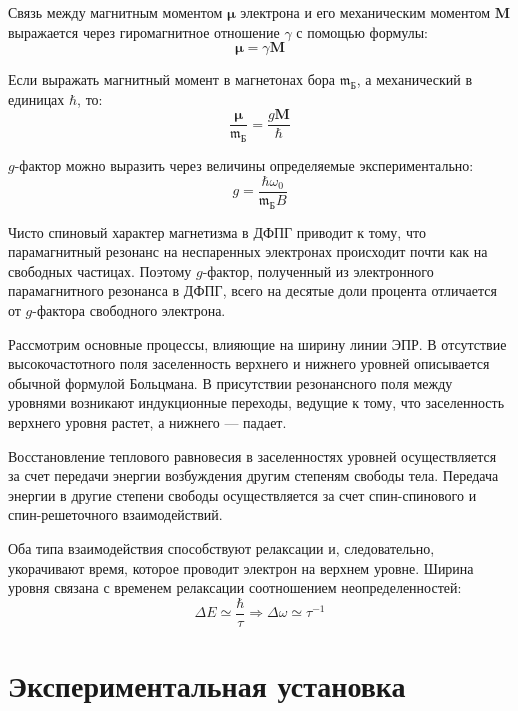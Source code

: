 \documentclass[reprint, nofootinbib, nobalancelastpage, 10pt]{revtex4-2}
\begin{document}
Связь между магнитным моментом $\bm{\mu}$ электрона и его механическим моментом
$\mathbf{M}$ выражается через гиромагнитное отношение $\gamma$ с помощью формулы:
\begin{equation}
	\bm{\mu} = \gamma \mathbf{M}
\end{equation}

Если выражать магнитный момент в магнетонах бора $\mathfrak{m}_{\text{Б}}$, а механический
в единицах $\hbar$, то:
\begin{equation}
	\dfrac{\bm{\mu}}{\mathfrak{m}_{\text{Б}} } = \dfrac{g \mathbf{M}}{\hbar}
\end{equation}

$g$-фактор можно выразить через величины определяемые экспериментально:
\begin{equation}
	g = \dfrac{\hbar \omega_0}{\mathfrak{m}_{\text{Б}} B}
\end{equation}

Чисто спиновый характер магнетизма в ДФПГ приводит к тому, что парамагнитный резонанс
на неспаренных электронах происходит почти как на свободных частицах. Поэтому $g$-фактор,
полученный из электронного парамагнитного резонанса в ДФПГ, всего на десятые доли процента
отличается от $g$-фактора свободного электрона.

Рассмотрим основные процессы, влияющие на ширину линии ЭПР. В отсутствие высокочастотного
поля заселенность верхнего и нижнего уровней описывается обычной формулой Больцмана.
В присутствии резонансного поля между уровнями возникают индукционные переходы, ведущие к
тому, что заселенность верхнего уровня растет, а нижнего --- падает.

Восстановление теплового равновесия в заселенностях уровней осуществляется за счет
передачи энергии возбуждения другим степеням свободы тела. Передача энергии в другие
степени свободы осуществляется за счет спин-спинового и спин-решеточного взаимодействий.

Оба типа взаимодействия способствуют релаксации и, следовательно, укорачивают время,
которое проводит электрон на верхнем уровне. Ширина уровня связана с временем релаксации
соотношением неопределенностей:
\begin{equation}
	\Delta E \simeq \dfrac{\hbar}{\tau} \Longrightarrow \Delta \omega \simeq \tau^{-1}
\end{equation}


\section*{Экспериментальная установка}
\end{document}
